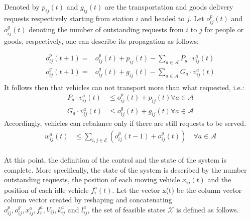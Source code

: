 Denoted by $p_{ij}(t)$ and $g_{ij}(t)$ are the transportation and goods delivery requests respectively starting from station $i$ and headed to $j$. Let $o^p_{ij}(t)$ and $o^g_{ij}(t)$ denoting the number of outstanding requests from $i$ to $j$ for people or goods, respectively, one can describe its propagation as follows:

\begin{equation}
	\begin{aligned}
		o^p_{ij}(t+1) =& o^p_{ij}(t) + p_{ij}(t) - \sum_{a \in \mathcal{A}} P_a\cdot v^a_{ij}(t)\\
			o^g_{ij}(t+1) =& o^g_{ij}(t) + g_{ij}(t) - \sum_{a \in \mathcal{A}} G_a \cdot v^a_{ij}(t)\\
	\end{aligned}
	\label{eq:demand_time}
\end{equation}
It follows then that vehicles can not transport more than what requested, i.e.:
\begin{equation}
	\begin{aligned}
	 P_a\cdot v^a_{ij}(t) &\leq o^p_{ij}(t) + p_{ij}(t) \forall a \in \mathcal{A} \\
	 G_a \cdot v^a_{ij}(t) &\leq o^g_{ij}(t) + g_{ij}(t) \forall a \in \mathcal{A}
	\end{aligned}
	 \label{eq:no_more_than_request}
\end{equation}
Accordingly, vehicles can rebalance only if there are still requests to be served. 
\begin{equation}
	\begin{aligned}
	 	w^a_{ij}(t) &\leq \sum_{i,j \in \mathcal{E}} (o^p_{ij}(t-1) +o^g_{ij}(t) )  \quad\forall a \in \mathcal{A} \\
	\end{aligned}
	\label{eq:no_reb_than_request}
\end{equation}

At this point, the definition of the control and the state of the system is complete. More specifically, the state of the system is described by the number outstanding requests, the position of each moving vehicle $x_{ij}(t)$ and the position of each idle vehicle $f^a_{i}(t)$. Let the vector x(t) be the column vector column vector created by reshaping and concatenating $o^p_{ij},o^g_{ij}, x_{ij}^a, f^a_{i}, V_{ij} , k^a_{ij} \text{ and } l^a_{ij}$, the set of feasible states $\mathcal{X}$ is defined as follows. 

